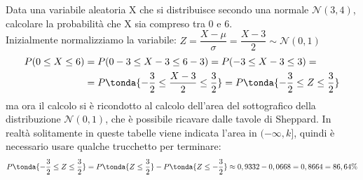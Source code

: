 \begin{esempio} Data una variabile aleatoria X che si distribuisce secondo una normale \(\mathcal{N}(3,4)\), calcolare la probabilità che X sia compreso tra 0 e 6.\\[6pt]
Inizialmente normalizziamo la variabile: \(Z =\dfrac{X-\mu}{\sigma} = \dfrac{X-3}{2} \sim \mathcal{N}(0,1)\)
\[\begin{split}P(0\leq X \leq 6) &= P(0-3 \leq X-3 \leq 6-3) = P(-3 \leq X-3 \leq 3)=\\& = P\tonda{-\dfrac{3}{2}\leq \dfrac{X-3}{2} \leq \dfrac{3}{2}} = P\tonda{-\dfrac{3}{2}\leq Z \leq \dfrac{3}{2}} \end{split} \]
ma ora il calcolo si è ricondotto al calcolo dell'area del sottografico della distribuzione \(\mathcal{N}(0,1)\), che è possibile ricavare dalle tavole di Sheppard. In realtà solitamente in queste tabelle viene indicata l'area in \((-\infty,k]\), quindi è necessario usare qualche trucchetto per terminare:
\[P\tonda{-\dfrac{3}{2}\leq Z \leq \dfrac{3}{2}} = P\tonda{Z \leq \dfrac{3}{2}}-P\tonda{Z \leq -\dfrac{3}{2}} \approx 0,9332-0,0668=0,8664 = 86,64 \%\]
\end{esempio}
